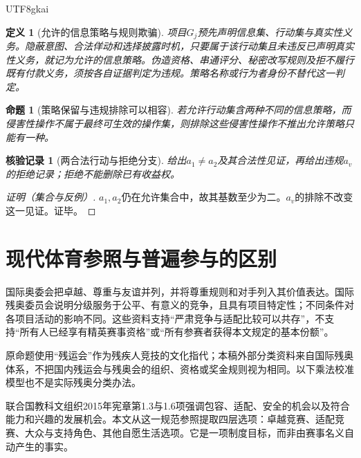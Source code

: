 \documentclass[12pt,a4paper,openany]{report}
\newtheorem{definition}{定义}[chapter]
\newtheorem{proposition}{命题}[chapter]
\newtheorem{Certificate}{核验记录}[chapter]
\begin{document}
\begin{CJK*}{UTF8}{gkai}
\begin{definition}[允许的信息策略与规则欺骗]
\label{def:strategy}
项目$G_j$预先声明信息集、行动集与真实性义务。隐蔽意图、合法佯动和选择披露时机，只要属于该行动集且未违反已声明真实性义务，就记为允许的信息策略。伪造资格、串通评分、秘密改写规则及拒不履行既有付款义务，须按各自证据判定为违规。策略名称或行为者身份不替代这一判定。
\end{definition}
\begin{proposition}[策略保留与违规排除可以相容]
\label{prop:strategy}
若允许行动集含两种不同的信息策略，而侵害性操作不属于最终可生效的操作集，则排除这些侵害性操作不推出允许策略只能有一种。
\end{proposition}
\begin{Certificate}[两合法行动与拒绝分支]
给出$a_1\ne a_2$及其合法性见证，再给出违规$a_v$的拒绝记录；拒绝不能删除已有收益权。
\end{Certificate}
\begin{proof}[证明（集合与反例）]
$a_1,a_2$仍在允许集合中，故其基数至少为二。$a_v$的排除不改变这一见证。证毕。
\end{proof}

\section{现代体育参照与普遍参与的区别}
国际奥委会把卓越、尊重与友谊并列，并将尊重规则和对手列入其价值表达\cite{IOCValues}。国际残奥委员会说明分级服务于公平、有意义的竞争，且具有项目特定性；不同条件对各项目活动的影响不同\cite{IPCClassification}。这些资料支持“严肃竞争与适配比较可以共存”，不支持“所有人已经享有精英赛事资格”或“所有参赛者获得本文规定的基本份额”。

原命题使用“残运会”作为残疾人竞技的文化指代；本稿外部分类资料来自国际残奥体系，不把国内残运会与残奥会的组织、资格或奖金规则视为相同。以下乘法校准模型也不是实际残奥分类办法。

联合国教科文组织2015年宪章第1.3与1.6项强调包容、适配、安全的机会以及符合能力和兴趣的发展机会\cite{UNESCOCharter}。本文从这一规范参照提取四层选项：卓越竞赛、适配竞赛、大众与支持角色、其他自愿生活选项。它是一项制度目标，而非由赛事名义自动产生的事实。


\end{CJK*}
\end{document}
